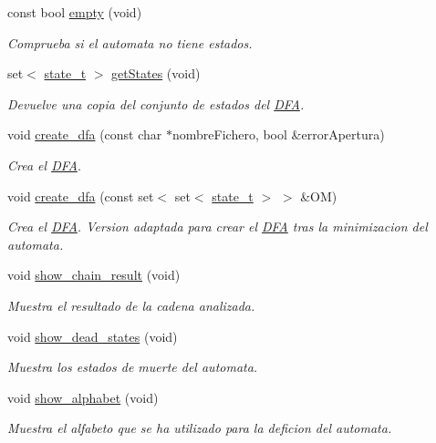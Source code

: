\begin{DoxyCompactItemize}
const bool \hyperlink{class_d_f_a_a165a6e75da0c003a78ddf437ef26169e}{empty} (void)
\begin{DoxyCompactList}\small\item\em Comprueba si el automata no tiene estados. \end{DoxyCompactList}\item 
set$<$ \hyperlink{classstate__t}{state\+\_\+t} $>$ \hyperlink{class_d_f_a_a4fd523c42b2981f0353d9a3df1771d9e}{get\+States} (void)
\begin{DoxyCompactList}\small\item\em Devuelve una copia del conjunto de estados del \hyperlink{class_d_f_a}{D\+FA}. \end{DoxyCompactList}\item 
void \hyperlink{class_d_f_a_a31d1ae734a752f28753d5fa3031c4f0c}{create\+\_\+dfa} (const char $\ast$nombre\+Fichero, bool \&error\+Apertura)
\begin{DoxyCompactList}\small\item\em Crea el \hyperlink{class_d_f_a}{D\+FA}. \end{DoxyCompactList}\item 
void \hyperlink{class_d_f_a_a06e28de0df3c54afe35ecebe60e88484}{create\+\_\+dfa} (const set$<$ set$<$ \hyperlink{classstate__t}{state\+\_\+t} $>$ $>$ \&OM)
\begin{DoxyCompactList}\small\item\em Crea el \hyperlink{class_d_f_a}{D\+FA}. Version adaptada para crear el \hyperlink{class_d_f_a}{D\+FA} tras la minimizacion del automata. \end{DoxyCompactList}\item 
void \hyperlink{class_d_f_a_a7b3b402a2383507bc7836a8fa8af9371}{show\+\_\+chain\+\_\+result} (void)
\begin{DoxyCompactList}\small\item\em Muestra el resultado de la cadena analizada. \end{DoxyCompactList}\item 
void \hyperlink{class_d_f_a_a311a5c043b5d11ea6ed4f34b8a901310}{show\+\_\+dead\+\_\+states} (void)
\begin{DoxyCompactList}\small\item\em Muestra los estados de muerte del automata. \end{DoxyCompactList}\item 
void \hyperlink{class_d_f_a_a3f03ba04e1130dafc0a62a101ecec61a}{show\+\_\+alphabet} (void)
\begin{DoxyCompactList}\small\item\em Muestra el alfabeto que se ha utilizado para la deficion del automata. \end{DoxyCompactList}\item 

\end{DoxyCompactItemize}
